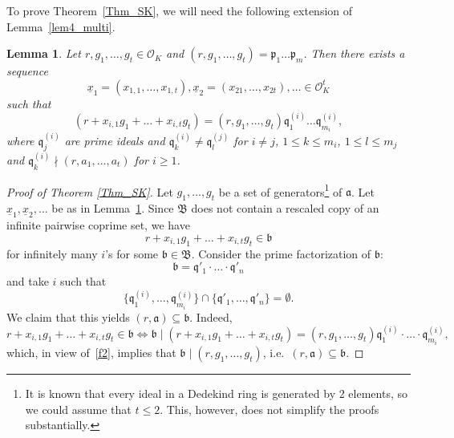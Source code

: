 \documentclass[leqno,a4paper,12pt]{article}
\newtheorem{Lemma}[Th]{Lemma}
\theoremstyle{definition}
\newcommand{\divides}{\mid}
\newcommand{\ndivides}{\nmid}
\newcommand{\OK}{\mathcal{O}_K}
\begin{document}
To prove Theorem~\ref{Thm_SK}, we will need the following extension of Lemma~\ref{lem4_multi}.
\begin{Lemma}\label{lem5_multi}
Let $r,g_1,\ldots,g_t\in\OK$ and $(r,g_1,\ldots,g_t)=\mathfrak{p}_1\ldots\mathfrak{p}_m$. Then there exists a sequence  \[
\underline{x}_1=(x_{1,1},\ldots,x_{1,t}),\underline{x}_2=(x_{21},\ldots,x_{2t}),\ldots\in\OK^t
\]
such that
\[
(r+x_{i,1}g_1+\ldots+x_{i,t}g_t)=(r,g_1,\ldots,g_t)\mathfrak{q}_1^{(i)}\ldots\mathfrak{q}_{m_i}^{(i)},
\]
where $\mathfrak{q}_j^{(i)}$ are prime ideals and
$\mathfrak{q}_k^{(i)}\neq\mathfrak{q}_l^{(j)}$ for $i\neq j$, $1\leq k\leq m_i$, $1\leq l\leq m_j$ and $\mathfrak{q}_k^{(i)}\ndivides(r,a_1,\ldots,a_t)$ for $i\geq1$.
\end{Lemma}

\begin{proof}[Proof of Theorem \ref{Thm_SK}]
Let $g_1,\dots,g_t$ be a set of generators\footnote{It is known that every ideal in a Dedekind ring is generated by 2 elements, so we could assume that $t\le 2$. This, however, does not simplify the proofs substantially.}    of $\mathfrak{a}$. Let $\underline{x}_1,\underline{x}_2,\dots$ be as in Lemma~\ref{lem5_multi}. Since $\mathfrak{B}$ does not contain a rescaled copy of an infinite pairwise coprime set, we have
\[
r+x_{i,1}g_1+\dots + x_{i,t}g_t\in\mathfrak{b}
\]
for infinitely many $i$'s for some $\mathfrak{b}\in\mathfrak{B}$. Consider the prime factorization of $\mathfrak{b}$:
\[
\mathfrak{b}=\mathfrak{q}'_1\cdot\ldots\cdot\mathfrak{q}'_n
\]
and take $i$ such that
\begin{equation}\label{f2}
\{\mathfrak{q}^{(i)}_1,\dots,\mathfrak{q}^{(i)}_{m_i}\}\cap \{\mathfrak{q}'_1,\dots,\mathfrak{q}'_n\}=\emptyset.
\end{equation}
We claim that this yields $(r,\mathfrak{a})\subseteq \mathfrak{b}$. Indeed,
\[
r+x_{i,1}g_1+\dots+x_{i,t}g_t\in\mathfrak{b} \iff \mathfrak{b} \divides (r+x_{i,1}g_1+\dots+x_{i,t}g_t)=(r,g_1,\dots,g_t)\mathfrak{q}_1^{(i)}\cdot\ldots\cdot \mathfrak{q}_{m_i}^{(i)},
\]
which, in view of~\eqref{f2}, implies that $\mathfrak{b}\divides (r,g_1,\dots,g_t)$, i.e.\ $(r,\mathfrak{a})\subseteq \mathfrak{b}$.
%
\end{proof}
\end{document}
